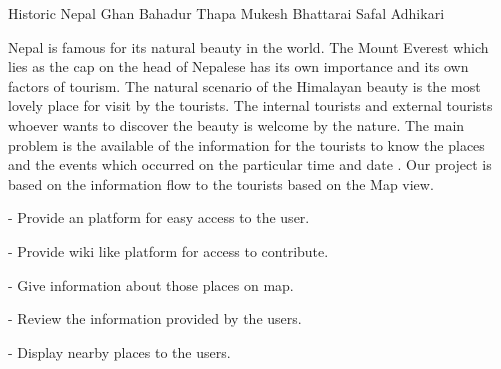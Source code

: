  \begin{conf-abstract}[]
 {Historic Nepal }
 {Ghan Bahadur Thapa
 	Mukesh Bhattarai
 	Safal Adhikari
 }
{}

Nepal is famous for its natural beauty in the world. The Mount Everest which lies as the cap on the head of Nepalese has its own importance and its own factors of tourism. The natural scenario of the Himalayan beauty is the most lovely place for visit by the tourists. The internal tourists and external tourists whoever wants to discover the beauty is welcome by the nature. The main problem is the available of the information for the tourists to know the places and the events which occurred on the particular time and date . Our project is based on the information flow to the tourists based on the Map view.  

-   Provide an platform for easy access to the user.

-	Provide wiki like platform for access to contribute.

-	Give information about those places on map.

-	Review the information provided by the users.

-	Display nearby places to the users.
 \end{conf-abstract}